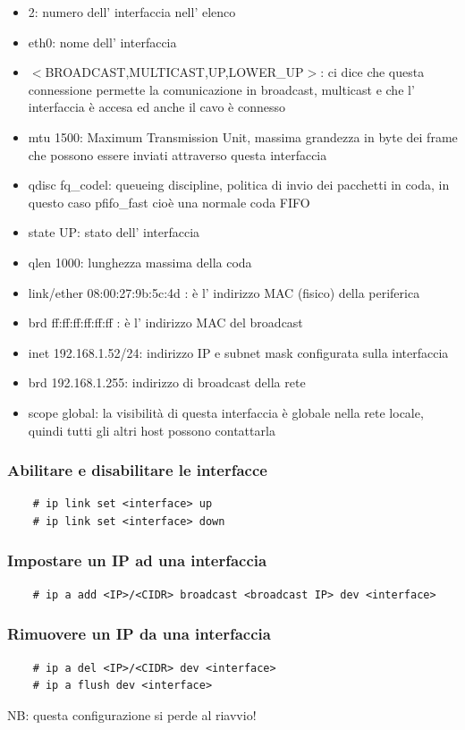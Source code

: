 \begin{itemize}
    \item 2: numero dell' interfaccia nell' elenco
    \item eth0: nome dell' interfaccia
    \item $<$BROADCAST,MULTICAST,UP,LOWER\_UP$>$: ci dice che questa connessione permette la comunicazione in broadcast, multicast e che l' interfaccia è accesa ed anche il cavo è connesso
    \item mtu 1500: Maximum Transmission Unit, massima grandezza in byte dei frame che possono essere inviati attraverso questa interfaccia
    \item qdisc fq\_codel: queueing discipline, politica di invio dei pacchetti in coda, in questo caso pfifo\_fast cioè una normale coda FIFO
    \item state UP: stato dell' interfaccia
    \item qlen 1000: lunghezza massima della coda
    \item link/ether 08:00:27:9b:5c:4d : è l' indirizzo MAC (fisico) della periferica
    \item brd ff:ff:ff:ff:ff:ff : è l' indirizzo MAC del broadcast
    \item inet 192.168.1.52/24: indirizzo IP e subnet mask configurata sulla interfaccia 
    \item brd 192.168.1.255: indirizzo di broadcast della rete
    \item scope global: la visibilità di questa interfaccia è globale nella rete locale, quindi tutti gli altri host possono contattarla
\end{itemize}

\subsubsection{Abilitare e disabilitare le interfacce}
\begin{verbatim}
    # ip link set <interface> up
    # ip link set <interface> down
\end{verbatim}

\subsubsection{Impostare un IP ad una interfaccia}
\begin{verbatim}
    # ip a add <IP>/<CIDR> broadcast <broadcast IP> dev <interface>
\end{verbatim}

\subsubsection{Rimuovere un IP da una interfaccia}
\begin{verbatim}
    # ip a del <IP>/<CIDR> dev <interface>
    # ip a flush dev <interface>
\end{verbatim}
NB: questa configurazione si perde al riavvio!

